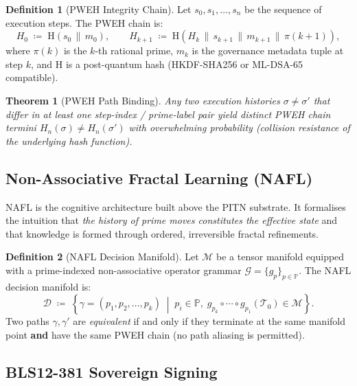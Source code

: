 \documentclass[12pt,a4paper]{article}
\theoremstyle{definition}
\newtheorem{definition}{Definition}[section]
\theoremstyle{plain}
\newtheorem{theorem}{Theorem}[section]
\theoremstyle{remark}
\begin{document}
\begin{definition}[PWEH Integrity Chain]
Let $s_0, s_1, \ldots, s_n$ be the sequence of execution steps. The PWEH
chain is:
\begin{equation}
  \label{eq:pweh}
  H_0 \;\coloneqq\; \mathrm{H}(s_0 \,\|\, m_0), \qquad
  H_{k+1} \;\coloneqq\; \mathrm{H}\!\left(H_k \,\|\, s_{k+1} \,\|\, m_{k+1}
    \,\|\, \pi(k+1)\right),
\end{equation}
where $\pi(k)$ is the $k$-th rational prime, $m_k$ is the governance metadata
tuple at step $k$, and $\mathrm{H}$ is a post-quantum hash (HKDF-SHA256 or
ML-DSA-65 compatible).
\end{definition}

\begin{theorem}[PWEH Path Binding]
Any two execution histories $\sigma \neq \sigma'$ that differ in at least one
step-index / prime-label pair yield distinct PWEH chain termini
$H_n(\sigma) \neq H_n(\sigma')$ with overwhelming probability
(collision resistance of the underlying hash function).
\end{theorem}

\subsection{Non-Associative Fractal Learning (NAFL)}

NAFL is the cognitive architecture built above the PITN substrate. It
formalises the intuition that \emph{the history of prime moves constitutes the
effective state} and that knowledge is formed through ordered, irreversible
fractal refinements.

\begin{definition}[NAFL Decision Manifold]
Let $\mathcal{M}$ be a tensor manifold equipped with a prime-indexed
non-associative operator grammar $\mathcal{G} = \{g_p\}_{p \in \mathbb{P}}$.
The NAFL decision manifold is:
\begin{equation}
  \mathcal{D} \;\coloneqq\;
  \left\{ \gamma = (p_1, p_2, \ldots, p_k) \;\middle|\;
    p_i \in \mathbb{P},\;
    g_{p_k} \circ \cdots \circ g_{p_1}(\mathcal{T}_0) \in \mathcal{M}
  \right\}.
\end{equation}
Two paths $\gamma, \gamma'$ are \emph{equivalent} if and only if they terminate
at the same manifold point \textbf{and} have the same PWEH chain (no path
aliasing is permitted).
\end{definition}

\subsection{BLS12-381 Sovereign Signing}
\end{document}

